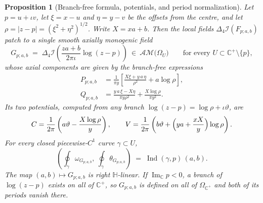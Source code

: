 \documentclass[11pt,a4paper]{article}
\numberwithin{equation}{section}
\newtheorem{proposition}[theorem]{Proposition}
\theoremstyle{definition}
\theoremstyle{remark}
\theoremstyle{plain}
\newcommand{\HH}{\mathbb H}
\newcommand{\CC}{\mathbb C}
\newcommand{\Cplus}{\CC^{+}}
\DeclareMathOperator{\Ind}{Ind}
\DeclareMathOperator{\Ima}{Im}
\newcommand{\lap}{\Delta_4}
\newcommand{\I}{\mathcal I}
\newcommand{\AM}{\mathcal{AM}}
\newcommand{\Om}{\Omega}
\newcommand{\om}{\omega}
\newcommand{\thet}{\theta}
\newcommand{\pot}{C}          %
\newcommand{\potV}{V}         %
\newcommand{\abs}[1]{\lvert #1\rvert}
\begin{document}
\begin{proposition}[Branch-free formula, potentials, and period
normalization]
\label{c:prop:modes}
Let $p=u+\iota v$, let $\xi=x-u$ and $\eta=y-v$ be the offsets from the
centre, and let $\rho=\abs{z-p}=(\xi^2+\eta^2)^{1/2}$.  Write
$X=xa+b$.  Then the local fields $\lap\I(F_{p;a,b})$ patch to a single
smooth axially monogenic field
\[
  G_{p;a,b}\;=\;\lap\I\!\left(\frac{za+b}{2\pi\iota}\log(z-p)\right)
  \ \in\ \AM\bigl(\Om_{U}\bigr)
  \qquad\text{for every }U\subset\Cplus\setminus\{p\},
\]
whose axial components are given by the branch-free expressions
\begin{align}
  P_{p;a,b}&=\frac1{\pi y}\left[\frac{X\xi+y\,a\,\eta}{\rho^{2}}
       +a\log\rho\right],
  \label{c:eq:mode-P}\\[2pt]
  Q_{p;a,b}&=\frac{y\,a\,\xi-X\eta}{\pi y\rho^{2}}
       +\frac{X\log\rho}{\pi y^{2}} .
  \label{c:eq:mode-Q}
\end{align}
Its two potentials, computed from any branch $\log(z-p)=\log\rho+\iota\vartheta$,
are
\begin{equation}
  \pot=\frac{1}{2\pi}\left(a\vartheta-\frac{X\log\rho}{y}\right),
  \qquad
  \potV=\frac{1}{2\pi}\left(b\vartheta
        +\Bigl(ya+\frac{xX}{y}\Bigr)\log\rho\right).
  \label{c:eq:mode-potentials}
\end{equation}
For every closed piecewise-$C^1$ curve $\gamma\subset U$,
\begin{equation}
  \left(\oint_\gamma\om_{G_{p;a,b}},\ \oint_\gamma\thet_{G_{p;a,b}}\right)
  \;=\;\Ind(\gamma,p)\,(a,b).
  \label{c:eq:mode-periods}
\end{equation}
The map $(a,b)\mapsto G_{p;a,b}$ is right $\HH$-linear.  If
$\Ima_{\CC}p<0$, a branch of $\log(z-p)$ exists on all of $\Cplus$, so
$G_{p;a,b}$ is defined on all of $\Om_{\Cplus}$ and both of its periods
vanish there.
\end{proposition}
\end{document}
